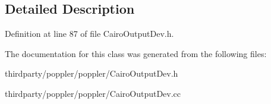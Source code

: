 \subsection{Detailed Description}


Definition at line 87 of file Cairo\+Output\+Dev.\+h.



The documentation for this class was generated from the following files\+:\begin{DoxyCompactItemize}
\item 
thirdparty/poppler/poppler/Cairo\+Output\+Dev.\+h\item 
thirdparty/poppler/poppler/Cairo\+Output\+Dev.\+cc\end{DoxyCompactItemize}
